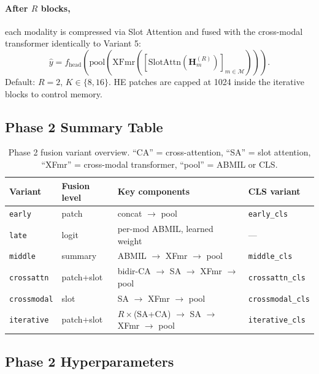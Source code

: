 \documentclass[11pt,a4paper]{article}
\begin{document}
\paragraph{After $R$ blocks,} each modality is compressed via Slot Attention
and fused with the cross-modal transformer identically to Variant 5:
\begin{equation}
    \hat{y} = f_\text{head}\!\left(
        \text{pool}\!\left(
            \mathrm{XFmr}\!\left(
                [\text{SlotAttn}(\mathbf{H}_m^{(R)})]_{m\in\mathcal{M}}
            \right)
        \right)\right).
\end{equation}
Default: $R=2$, $K\in\{8,16\}$.
HE patches are capped at 1024 inside the iterative blocks to control memory.

\subsection{Phase 2 Summary Table}

\begin{table}[h]
\centering
\caption{Phase 2 fusion variant overview. ``CA'' = cross-attention,
  ``SA'' = slot attention, ``XFmr'' = cross-modal transformer,
  ``pool'' = ABMIL or CLS.}
\label{tab:p2_variants}
\begin{tabular}{llll}
\toprule
Variant & Fusion level & Key components & CLS variant \\
\midrule
\texttt{early}      & patch      & concat $\to$ pool
    & \texttt{early\_cls} \\
\texttt{late}       & logit      & per-mod ABMIL, learned weight
    & {---} \\
\texttt{middle}     & summary    & ABMIL $\to$ XFmr $\to$ pool
    & \texttt{middle\_cls} \\
\texttt{crossattn}  & patch+slot & bidir-CA $\to$ SA $\to$ XFmr $\to$ pool
    & \texttt{crossattn\_cls} \\
\texttt{crossmodal} & slot       & SA $\to$ XFmr $\to$ pool
    & \texttt{crossmodal\_cls} \\
\texttt{iterative}  & patch+slot & $R\times$(SA+CA) $\to$ SA $\to$ XFmr $\to$ pool
    & \texttt{iterative\_cls} \\
\bottomrule
\end{tabular}
\end{table}

\subsection{Phase 2 Hyperparameters}
\end{document}
